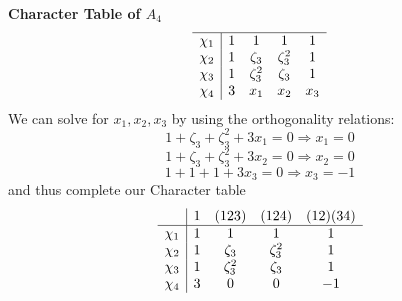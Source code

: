 \documentclass[12pt]{article}
\newenvironment{ques}[1]{\textbf{#1}\vspace{1 mm}\\ }{\bigskip}
\theoremstyle{definition}
\begin{document}
\begin{ques}{Character Table of $A_4$}
$$\begin{array}{c| c c c c}
	\hline
	\chi_1 & 1 & 1 & 1 & 1 \\
	\chi_2 & 1 & \zeta_3 & \zeta_3^2 & 1 \\
	\chi_3 & 1 & \zeta_3^2 & \zeta_3 & 1 \\
	\chi_4 & 3 & x_1 & x_2 & x_3 \\
	\end{array}
	$$
	We can solve for $x_1, x_2, x_3$ by using the orthogonality relations:
	$$1 + \zeta_3 + \zeta_3^2 + 3x_1 = 0 \Rightarrow x_1 = 0$$
	$$1 + \zeta_3 + \zeta_3^2 + 3x_2 = 0 \Rightarrow x_2 = 0$$
	$$1 + 1 + 1 + 3x_3 = 0 \Rightarrow x_3 = -1$$
	and thus complete our Character table
	$$
	\begin{array}{c| c c c c}
	 & 1  & (123) & (124) & (12)(34) \\
	\hline
	\chi_1 & 1 & 1 & 1 & 1 \\
	\chi_2 & 1 & \zeta_3 & \zeta_3^2 & 1 \\
	\chi_3 & 1 & \zeta_3^2 & \zeta_3 & 1 \\
	\chi_4 & 3 & 0 & 0 & -1 \\
	\end{array}
	$$
\end{ques}
\end{document}
